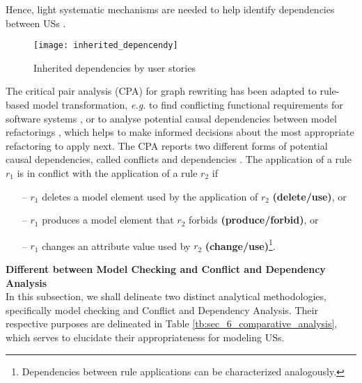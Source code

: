 Hence, light systematic mechanisms are needed to help identify dependencies between USs \cite{gomez2010systematic}.
\begin{figure}
\center
\texttt{[image: inherited\_depencendy]}
\caption{  Inherited dependencies by user stories\cite{gomez2010systematic} }\label{fig:inherited_dependencies}
\end{figure}
The critical pair analysis (CPA) for graph rewriting \cite{hartmanis2006monographs} has been adapted to rule-based model transformation, \emph{e.g.} to find conflicting functional requirements for software systems \cite{hausmann2002detection}, or to analyse potential causal dependencies between model refactorings \cite{mens2007analysing}, which helps to make informed decisions about the most appropriate refactoring to apply next. The CPA reports two different forms of potential causal dependencies, called conflicts and dependencies \cite{born2015analyzing}.
The application of a rule $r_1$ is in conflict with the application of a rule $r_2$ if
\begin{itemize}
\item[--] $r_1$ deletes a model element used by the application of $r_2$ \textbf{(delete/use)}, or
\item[--] $r_1$ produces a model element that $r_2$ forbids \textbf{(produce/forbid)}, or
\item[--] $r_1$ changes an attribute value used by $r_2$ \textbf{(change/use)}\footnote{Dependencies between rule applications can be characterized analogously.}. 
\end{itemize}
\textbf{Different between Model Checking and Conflict and Dependency Analysis}\\ 
In this subsection, we shall delineate two distinct analytical methodologies, specifically model checking and Conflict and Dependency Analysis. Their respective purposes are delineated in Table \ref{tb:sec_6_comparative_analysis}, which serves to elucidate their appropriateness for modeling USs.

